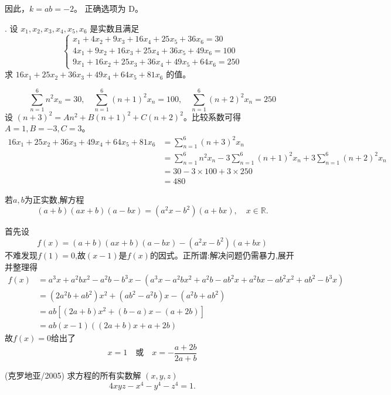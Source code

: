 \begin{questions}
\begin{solution}
因此，$k = ab = -2$。
正确选项为 D。
\end{solution}

    . 设 $x_1, x_2, x_3, x_4, x_5, x_6$ 是实数且满足
\[
\begin{cases}
x_1 + 4x_2 + 9x_3 + 16x_4 + 25x_5 + 36x_6 = 30 \\
4x_1 + 9x_2 + 16x_3 + 25x_4 + 36x_5 + 49x_6 = 100 \\
9x_1 + 16x_2 + 25x_3 + 36x_4 + 49x_5 + 64x_6 = 250
\end{cases}
\]
求 $16x_1 + 25x_2 + 36x_3 + 49x_4 + 64x_5 + 81x_6$ 的值。

\begin{solution}
\[
\sum_{n=1}^{6} n^2 x_n = 30, \quad \sum_{n=1}^{6} (n+1)^2 x_n = 100, \quad \sum_{n=1}^{6} (n+2)^2 x_n = 250
\]
设 $(n+3)^2 = An^2 + B(n+1)^2 + C(n+2)^2$。比较系数可得 $A=1, B=-3, C=3$。
\begin{align*}
16x_1 + 25x_2 + 36x_3 + 49x_4 + 64x_5 + 81x_6 &= \sum_{n=1}^{6} (n+3)^2 x_n \\
&= \sum_{n=1}^{6} n^2 x_n - 3\sum_{n=1}^{6} (n+1)^2 x_n + 3\sum_{n=1}^{6} (n+2)^2 x_n \\
&= 30 - 3 \times 100 + 3 \times 250 \\
&= 480
\end{align*}
\end{solution}

    \question 若$a,b$为正实数,解方程
    \[
    (a+b)(ax+b)(a-bx)=(a^2x-b^2)(a+bx), \quad x\in \mathbb{R}.
    \]
    \begin{solution}
        首先设
        \[
        f(x)=(a+b)(ax+b)(a-bx)-(a^2x-b^2)(a+bx)
        \]
        不难发现$f(1)=0$,故$(x-1)$是$f(x)$的因式。正所谓:解决问题仍需暴力,展开并整理得
        \begin{align*}
        f(x) &= a^3x + a^2bx^2 - a^2b - b^3x - (a^3x - a^2bx^2 + a^2b - ab^2x + a^2bx - ab^2x^2 + ab^2 - b^3x) \\
        &= (2a^2b + ab^2)x^2 + (ab^2 - a^2b)x - (a^2b + ab^2) \\
        &= ab[(2a+b)x^2 + (b-a)x - (a+2b)] \\
        &= ab(x-1)((2a+b)x+a+2b)
        \end{align*}
        故$f(x)=0$给出了
        \[
        x = 1 \quad \text{或} \quad x = -\frac{a+2b}{2a+b}
        \]
    \end{solution}

        \question (克罗地亚/2005) 求方程的所有实数解 $(x, y, z)$
\[
4xyz - x^4 - y^4 - z^4 = 1.
\]


\end{questions}

